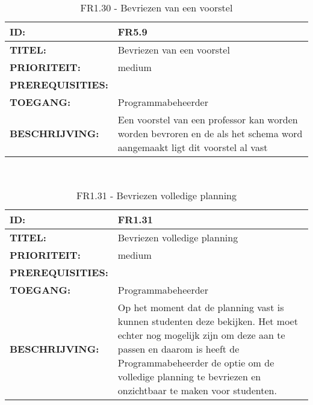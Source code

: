 \noindent\begin{table}[H]
            \begin{tabular}{l | p{10cm}}
                \textbf{ID:} & FR5.9 \\ \hline
                \textbf{TITEL:} & Bevriezen van een voorstel\\ \hline
                \textbf{PRIORITEIT:} &  medium \\ \hline
                \textbf{PREREQUISITIES:} & \\ \hline
                \textbf{TOEGANG:} & Programmabeheerder \\ \hline
                \textbf{BESCHRIJVING:} & Een voorstel van een professor kan worden worden bevroren en de als het schema word aangemaakt ligt dit voorstel al vast\\ 
            \end{tabular}\\
            \caption{FR1.30 - Bevriezen van een voorstel}
            \label{tab:FR1.30 - Bevriezen van een voorstel}
        \end{table}
        
\noindent\begin{table}[H]
            \begin{tabular}{l | p{10cm}}
                \textbf{ID:} & FR1.31 \\ \hline
                \textbf{TITEL:} & Bevriezen volledige planning\\ \hline
                \textbf{PRIORITEIT:} &  medium \\ \hline
                \textbf{PREREQUISITIES:} & \\ \hline
                \textbf{TOEGANG:} & Programmabeheerder \\ \hline
                \textbf{BESCHRIJVING:} & Op het moment dat de planning vast is kunnen studenten deze bekijken. Het moet echter nog mogelijk zijn om deze aan te passen en daarom is heeft de Programmabeheerder de optie om de volledige planning te bevriezen en onzichtbaar te maken voor studenten.\\ 
            \end{tabular}\\
            \caption{FR1.31 - Bevriezen volledige planning}
            \label{tab:FR1.31 - Bevriezen volledige planning}
        \end{table}   

